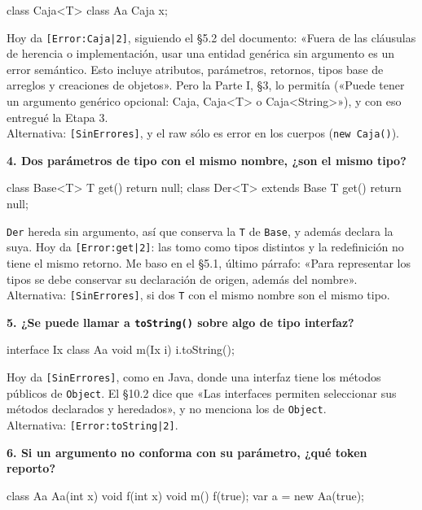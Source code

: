\documentclass[12pt,a4paper]{article}
\newcommand{\cod}[1]{\texttt{#1}}
\newcommand{\pregunta}[1]{\par\medskip\needspace{4\baselineskip}\noindent\textbf{#1}\par\smallskip}
\begin{document}
\begin{fuente}
class Caja<T> { }
class Aa { Caja x; }
\end{fuente}

Hoy da \cod{[Error:Caja|2]}, siguiendo el §5.2 del documento: «Fuera de las cláusulas de herencia o
implementación, usar una entidad genérica sin argumento es un error semántico. Esto incluye
atributos, parámetros, retornos, tipos base de arreglos y creaciones de objetos». Pero la Parte I,
§3, lo permitía («Puede tener un argumento genérico opcional: Caja, Caja<T> o Caja<String>»), y con
eso entregué la Etapa 3.\\
Alternativa: \cod{[SinErrores]}, y el raw sólo es error en los cuerpos (\cod{new Caja()}).

\pregunta{4. Dos parámetros de tipo con el mismo nombre, ¿son el mismo tipo?}

\begin{fuente}
class Base<T> { T get() { return null; } }
class Der<T> extends Base { T get() { return null; } }
\end{fuente}

\cod{Der} hereda sin argumento, así que conserva la \cod{T} de \cod{Base}, y además declara la suya.
Hoy da \cod{[Error:get|2]}: las tomo como tipos distintos y la redefinición no tiene el mismo
retorno. Me baso en el §5.1, último párrafo: «Para representar los tipos se debe conservar su
declaración de origen, además del nombre».\\
Alternativa: \cod{[SinErrores]}, si dos \cod{T} con el mismo nombre son el mismo tipo.

\pregunta{5. ¿Se puede llamar a \cod{toString()} sobre algo de tipo interfaz?}

\begin{fuente}
interface Ix { }
class Aa { void m(Ix i) { i.toString(); } }
\end{fuente}

Hoy da \cod{[SinErrores]}, como en Java, donde una interfaz tiene los métodos públicos de
\cod{Object}. El §10.2 dice que «Las interfaces permiten seleccionar sus métodos declarados y
heredados», y no menciona los de \cod{Object}.\\
Alternativa: \cod{[Error:toString|2]}.

\pregunta{6. Si un argumento no conforma con su parámetro, ¿qué token reporto?}

\begin{fuente}
class Aa {
    Aa(int x) { }
    void f(int x) { }
    void m() {
        f(true);
        var a = new Aa(true);
    }
}
\end{fuente}
\end{document}
